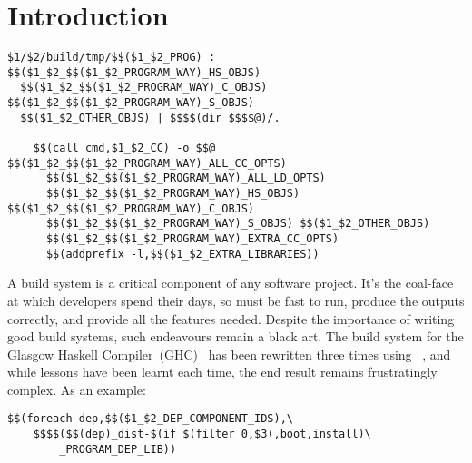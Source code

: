 \section{Introduction}


\begin{lstlisting}[basicstyle=\tiny]
$1/$2/build/tmp/$$($1_$2_PROG) : $$($1_$2_$$($1_$2_PROGRAM_WAY)_HS_OBJS)
  $$($1_$2_$$($1_$2_PROGRAM_WAY)_C_OBJS) $$($1_$2_$$($1_$2_PROGRAM_WAY)_S_OBJS)
  $$($1_$2_OTHER_OBJS) | $$$$(dir $$$$@)/.
  
	$$(call cmd,$1_$2_CC) -o $$@ $$($1_$2_$$($1_$2_PROGRAM_WAY)_ALL_CC_OPTS)
	  $$($1_$2_$$($1_$2_PROGRAM_WAY)_ALL_LD_OPTS)
	  $$($1_$2_$$($1_$2_PROGRAM_WAY)_HS_OBJS) $$($1_$2_$$($1_$2_PROGRAM_WAY)_C_OBJS)
	  $$($1_$2_$$($1_$2_PROGRAM_WAY)_S_OBJS) $$($1_$2_OTHER_OBJS)
	  $$($1_$2_$$($1_$2_PROGRAM_WAY)_EXTRA_CC_OPTS)
	  $$(addprefix -l,$$($1_$2_EXTRA_LIBRARIES))
\end{lstlisting}



A build system is a critical component of any software project. It's the
coal-face at which developers spend their days, so must be fast to run, produce
the outputs correctly, and provide all the features needed. Despite the
importance of writing good build systems, such endeavours remain a black art.
The build system for the Glasgow Haskell Compiler~(GHC)~\cite{ghc} has been
rewritten three times using \make{}~\cite{make}, and while lessons have been
learnt each time, the end result remains frustratingly complex. As an example:

\begin{lstlisting}
$$(foreach dep,$$($1_$2_DEP_COMPONENT_IDS),\
    $$$$($$(dep)_dist-$(if $(filter 0,$3),boot,install)\
        _PROGRAM_DEP_LIB))
\end{lstlisting}


